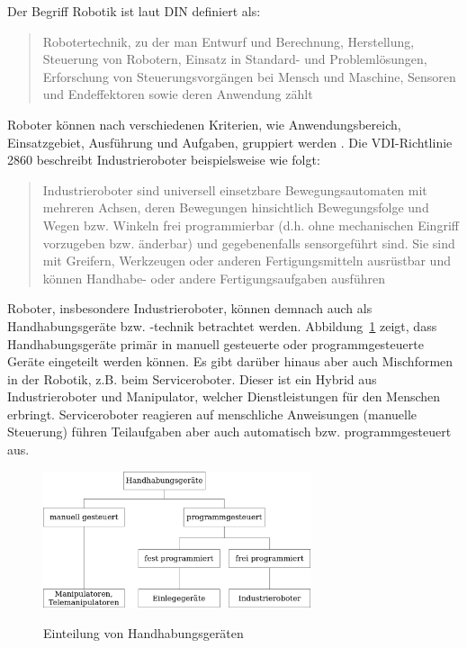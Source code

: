 \documentclass[11pt,ngerman,parskip=half]{scrartcl}
\begin{document}
Der Begriff Robotik ist laut DIN definiert als:
\blockquote[{\cite[DIN EN ISO 8373, zitiert nach][39]
{hesse_taschenbuch_2016}}]{Robotertechnik, zu der man Entwurf und
Berechnung, Herstellung, Steuerung von Robotern, Einsatz in Standard- und
Problemlösungen, Erforschung von Steuerungsvorgängen bei Mensch und Maschine,
Sensoren und Endeffektoren sowie deren Anwendung zählt}.
Roboter können nach verschiedenen Kriterien, wie Anwendungsbereich,
Einsatzgebiet, Ausführung und Aufgaben, gruppiert werden
\parencite[vgl.][25\psq]{hesse_taschenbuch_2016}. Die VDI-Richtlinie 2860
beschreibt Industrieroboter beispielsweise wie folgt:
\blockquote[{\cite[VDI-Richtlinie 2860, zitiert nach][16]
{weber_industrieroboter:_2017}}]{Industrieroboter sind universell
einsetzbare Bewegungsautomaten mit mehreren Achsen, deren Bewegungen
hinsichtlich Bewegungsfolge und Wegen bzw. Winkeln frei programmierbar (d.h.
ohne mechanischen Eingriff vorzugeben bzw. änderbar) und gegebenenfalls
sensorgeführt sind. Sie sind mit Greifern, Werkzeugen oder anderen
Fertigungsmitteln ausrüstbar und können Handhabe- oder andere
Fertigungsaufgaben ausführen}.

Roboter, insbesondere Industrieroboter, können demnach auch als
Handhabungsgeräte bzw. -technik betrachtet werden.
Abbildung~\ref{img:einteilung-von-handhabungsgeraeten} zeigt, dass
Handhabungsgeräte primär in manuell gesteuerte oder programmgesteuerte Geräte
eingeteilt werden können. Es gibt darüber hinaus aber auch Mischformen in der
Robotik, z.B. beim Serviceroboter. Dieser ist ein Hybrid aus Industrieroboter
und Manipulator, welcher Dienstleistungen für den Menschen erbringt.
Serviceroboter reagieren auf menschliche Anweisungen (manuelle Steuerung)
führen Teilaufgaben aber auch automatisch bzw. programmgesteuert aus.
\parencite[vgl.][15--17]{weber_industrieroboter:_2017}

\begin{figure}[H]
  \centering
  \includegraphics[width=0.7\textwidth]{src/img/einteilung-von-handhabungsgeraeten.png}
  \caption{Einteilung von Handhabungsgeräten}
  \label{img:einteilung-von-handhabungsgeraeten}
  \parencite[][16]{weber_industrieroboter:_2017}
\end{figure}
\end{document}

